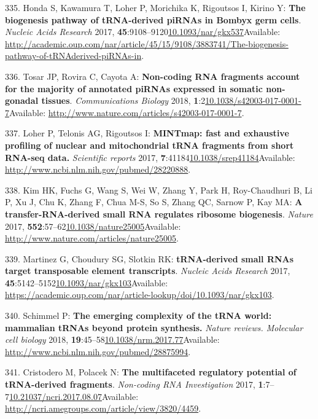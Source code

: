 \documentclass[
]{book}
\begin{document}
\leavevmode\hypertarget{ref-Honda2017}{}%
335. Honda S, Kawamura T, Loher P, Morichika K, Rigoutsos I, Kirino Y: \textbf{The biogenesis pathway of tRNA-derived piRNAs in Bombyx germ cells}. \emph{Nucleic Acids Research} 2017, \textbf{45}:9108--9120\href{https://doi.org/10.1093/nar/gkx537}{10.1093/nar/gkx537}Available: \url{http://academic.oup.com/nar/article/45/15/9108/3883741/The-biogenesis-pathway-of-tRNAderived-piRNAs-in}.

\leavevmode\hypertarget{ref-Tosar2018}{}%
336. Tosar JP, Rovira C, Cayota A: \textbf{Non-coding RNA fragments account for the majority of annotated piRNAs expressed in somatic non-gonadal tissues}. \emph{Communications Biology} 2018, \textbf{1}:2\href{https://doi.org/10.1038/s42003-017-0001-7}{10.1038/s42003-017-0001-7}Available: \url{http://www.nature.com/articles/s42003-017-0001-7}.

\leavevmode\hypertarget{ref-Loher2017}{}%
337. Loher P, Telonis AG, Rigoutsos I: \textbf{MINTmap: fast and exhaustive profiling of nuclear and mitochondrial tRNA fragments from short RNA-seq data.} \emph{Scientific reports} 2017, \textbf{7}:41184\href{https://doi.org/10.1038/srep41184}{10.1038/srep41184}Available: \url{http://www.ncbi.nlm.nih.gov/pubmed/28220888}.

\leavevmode\hypertarget{ref-Kim2017}{}%
338. Kim HK, Fuchs G, Wang S, Wei W, Zhang Y, Park H, Roy-Chaudhuri B, Li P, Xu J, Chu K, Zhang F, Chua M-S, So S, Zhang QC, Sarnow P, Kay MA: \textbf{A transfer-RNA-derived small RNA regulates ribosome biogenesis}. \emph{Nature} 2017, \textbf{552}:57--62\href{https://doi.org/10.1038/nature25005}{10.1038/nature25005}Available: \url{http://www.nature.com/articles/nature25005}.

\leavevmode\hypertarget{ref-Martinez2017}{}%
339. Martinez G, Choudury SG, Slotkin RK: \textbf{tRNA-derived small RNAs target transposable element transcripts}. \emph{Nucleic Acids Research} 2017, \textbf{45}:5142--5152\href{https://doi.org/10.1093/nar/gkx103}{10.1093/nar/gkx103}Available: \url{https://academic.oup.com/nar/article-lookup/doi/10.1093/nar/gkx103}.

\leavevmode\hypertarget{ref-Schimmel2017}{}%
340. Schimmel P: \textbf{The emerging complexity of the tRNA world: mammalian tRNAs beyond protein synthesis.} \emph{Nature reviews. Molecular cell biology} 2018, \textbf{19}:45--58\href{https://doi.org/10.1038/nrm.2017.77}{10.1038/nrm.2017.77}Available: \url{http://www.ncbi.nlm.nih.gov/pubmed/28875994}.

\leavevmode\hypertarget{ref-Cristodero2017}{}%
341. Cristodero M, Polacek N: \textbf{The multifaceted regulatory potential of tRNA-derived fragments}. \emph{Non-coding RNA Investigation} 2017, \textbf{1}:7--7\href{https://doi.org/10.21037/ncri.2017.08.07}{10.21037/ncri.2017.08.07}Available: \url{http://ncri.amegroups.com/article/view/3820/4459}.
\end{document}
